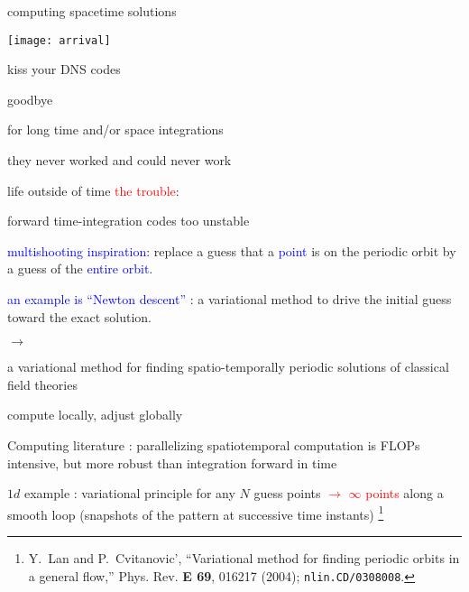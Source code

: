 \begin{frame}{computing spacetime solutions}
\begin{center}
\texttt{[image: arrival]}
\end{center}
\end{frame}

\begin{frame}{kiss your DNS codes}
\begin{center}
{\huge goodbye}
\end{center}

\vfill

for long time and/or space integrations

\medskip

\hfill they never worked and could never work
\end{frame}

\begin{frame}{life outside of time}
\textcolor{red}{the trouble}:

forward time-integration codes too unstable

\bigskip
\bigskip

\textcolor{blue}{multishooting inspiration}:
 replace a guess that a  \textcolor{blue}{point} is on the periodic
orbit by a guess of the \textcolor{blue}{entire orbit}.

\bigskip

\textcolor{blue}{an example is ``Newton descent''} :
a variational method
to drive the initial guess toward the exact solution.

\bigskip

$\to$

\bigskip

a variational method for finding
spatio-temporally periodic solutions of classical field theories
\end{frame}

\begin{frame}{compute locally, adjust globally}

Computing literature : parallelizing {\color{red}spatiotemporal}
computation is FLOPs intensive, but more robust than
integration forward in time

\end{frame}


\begin{frame}{$1d$ example : variational principle for any \po}
$N$ guess points \textcolor{red}{$\to$ $\infty$ points}
along a smooth loop
(snapshots of the pattern at successive time instants)%
\footnote{Y.~Lan and P.~Cvitanovic',
        ``Variational method for finding periodic orbits
        in a general flow,''
	{Phys. Rev. \bf E 69}, 016217 (2004);
         {\tt nlin.CD/0308008}.
	 }
\end{frame}

